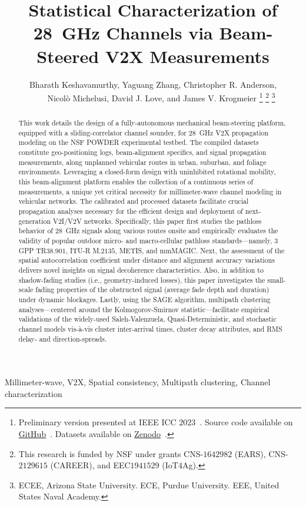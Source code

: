 \documentclass[12pt, draftcls, onecolumn]{IEEEtran}
\title{Statistical Characterization of \SI{28}{\giga\hertz} Channels via Beam-Steered V2X Measurements}
\author{Bharath Keshavamurthy\IEEEauthorrefmark{1}, Yaguang Zhang\IEEEauthorrefmark{2}, Christopher R. Anderson\IEEEauthorrefmark{3},\\\ \ \ \ Nicol\`{o} Michelusi\IEEEauthorrefmark{1}, David J. Love\IEEEauthorrefmark{2}, and James V. Krogmeier\IEEEauthorrefmark{2}
\thanks{Preliminary version presented at IEEE ICC $2023$~\cite{SPAVE_ICC}. Source code available on \href{https://github.com/bharathkeshavamurthy/SPAVE-28G}{GitHub}~\cite{SPAVE_Source_Code}. Datasets available on \href{https://doi.org/10.5281/zenodo.7178597}{Zenodo}~\cite{SPAVE_Dataset}.}
\thanks{This research is funded by NSF under grants CNS-$1642982$ (EARS), CNS-$2129615$ (CAREER), and EEC$1941529$ (IoT$4$Ag).}
\thanks{\IEEEauthorrefmark{1}ECEE, Arizona State University. \IEEEauthorrefmark{2}ECE, Purdue University. \IEEEauthorrefmark{3}EEE, United States Naval Academy.}
\vspace{-5mm}
}
\begin{document}

\maketitle
\thispagestyle{plain}
\pagestyle{plain}
\vspace{-5mm}

\begin{abstract}
This work details the design of a fully-autonomous mechanical beam-steering platform, equipped with a sliding-correlator channel sounder, for \SI{28}{\giga\hertz} V2X propagation modeling on the NSF POWDER experimental testbed. The compiled datasets constitute geo-positioning logs, beam-alignment specifics, and signal propagation measurements, along unplanned vehicular routes in urban, suburban, and foliage environments. Leveraging a closed-form design with uninhibited rotational mobility, this beam-alignment platform enables the collection of a continuous series of measurements, a unique yet critical necessity for millimeter-wave channel modeling in vehicular networks. The calibrated and processed datasets facilitate crucial propagation analyses necessary for the efficient design and deployment of next-generation V$2$I/V$2$V networks. Specifically, this paper first studies the pathloss behavior of \SI{28}{\giga\hertz} signals along various routes onsite and empirically evaluates the validity of popular outdoor micro- and macro-cellular pathloss standards---namely, $3$GPP TR$38.901$, ITU-R M$.2135$, METIS, and mmMAGIC. Next, the assessment of the spatial autocorrelation coefficient under distance and alignment accuracy variations delivers novel insights on signal decoherence characteristics. Also, in addition to shadow-fading studies (i.e., geometry-induced losses), this paper investigates the small-scale fading properties of the obstructed signal (average fade depth and duration) under dynamic blockages. Lastly, using the SAGE algorithm, multipath clustering analyses---centered around the Kolmogorov-Smirnov statistic---facilitate empirical validations of the widely-used Saleh-Valenzuela, Quasi-Deterministic, and stochastic channel models vis-\`{a}-vis cluster inter-arrival times, cluster decay attributes, and RMS delay- and direction-spreads.
\end{abstract}

\begin{IEEEkeywords}
    \begin{center}
        Millimeter-wave, V$2$X, Spatial consistency, Multipath clustering, Channel characterization
    \end{center}
\end{IEEEkeywords}
\clearpage
\end{document}
